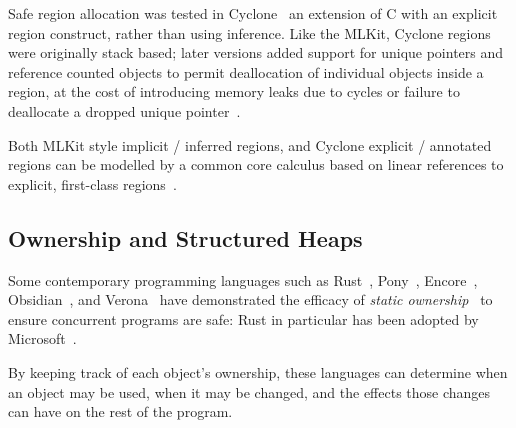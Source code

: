 Safe region allocation was tested in
Cyclone~\cite{grossman_region-based_2002} an extension of C
with an explicit region construct, rather than using
inference. Like the MLKit, Cyclone regions were originally stack
based; later versions added support for unique pointers and
reference counted objects to permit deallocation of individual
objects inside a region, at the cost of introducing memory leaks
due to cycles or failure to deallocate a dropped unique
pointer~\cite{cyclone-ismm2004}.

Both MLKit style implicit /
inferred regions, and Cyclone explicit / annotated regions can be
modelled by a common core calculus based on linear references to
explicit, first-class
regions~\cite{fluet-linear-regions-esop2006}.




\subsection{Ownership and Structured Heaps}

Some
contemporary programming languages such as
Rust~\cite{RustBook}, Pony~\cite{PonyTS},
Encore~\cite{EncoreTS},
Obsidian~\cite{aldrichObsidianStudy2020}, and
Verona~\cite{Verona} 
have demonstrated the efficacy of \textit{static
  ownership}~\cite{ClaPotNobOOPSLA98,noble_flexible_1998} %
to ensure
concurrent programs are safe: Rust in particular has been adopted by
Microsoft~\cite{RustPopular,MSRust}.

By keeping track of each object's
ownership, these languages can determine when an object may be used,
when it may be changed, and the effects those changes can have on the
rest of the program. 


